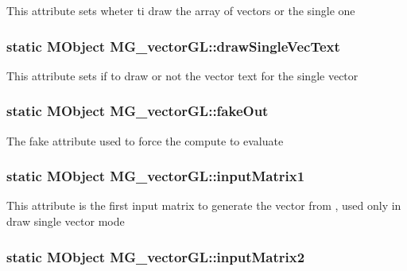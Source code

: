 This attribute sets wheter ti draw the array of vectors or the single one \hypertarget{class_m_g__vector_g_l_a05f25839a380964b6abbfa1d7ef8c691}{
\subsubsection[{draw\-Single\-Vec\-Text}]{\setlength{\rightskip}{0pt plus 5cm}static M\-Object M\-G\-\_\-vector\-G\-L\-::draw\-Single\-Vec\-Text\hspace{0.3cm}{\ttfamily [static]}}}\label{class_m_g__vector_g_l_a05f25839a380964b6abbfa1d7ef8c691}
This attribute sets if to draw or not the vector text for the single vector \hypertarget{class_m_g__vector_g_l_ac9e29eb01772ab64b67fe0ac130dceef}{
\subsubsection[{fake\-Out}]{\setlength{\rightskip}{0pt plus 5cm}static M\-Object M\-G\-\_\-vector\-G\-L\-::fake\-Out\hspace{0.3cm}{\ttfamily [static]}}}\label{class_m_g__vector_g_l_ac9e29eb01772ab64b67fe0ac130dceef}
The fake attribute used to force the compute to evaluate \hypertarget{class_m_g__vector_g_l_a8925db7e20eeb6ec2ca3a7afe829866a}{
\subsubsection[{input\-Matrix1}]{\setlength{\rightskip}{0pt plus 5cm}static M\-Object M\-G\-\_\-vector\-G\-L\-::input\-Matrix1\hspace{0.3cm}{\ttfamily [static]}}}\label{class_m_g__vector_g_l_a8925db7e20eeb6ec2ca3a7afe829866a}
This attribute is the first input matrix to generate the vector from , used only in draw single vector mode \hypertarget{class_m_g__vector_g_l_a68e287bd95b5110218020a612de4bf77}{
\subsubsection[{input\-Matrix2}]{\setlength{\rightskip}{0pt plus 5cm}static M\-Object M\-G\-\_\-vector\-G\-L\-::input\-Matrix2\hspace{0.3cm}{\ttfamily [static]}}}\label{class_m_g__vector_g_l_a68e287bd95b5110218020a612de4bf77}
